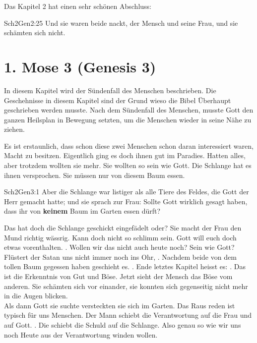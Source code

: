 Das Kapitel 2 hat einen sehr schönen Abschluss:
\begin{bibeltext}{Sch2}{Gen}{2:25}
	Und sie waren beide nackt, der Mensch und seine Frau, und sie schämten sich nicht.
\end{bibeltext}
\section{1. Mose 3 (Genesis 3)}
In diesem Kapitel wird der Sündenfall des Menschen beschrieben. Die Geschehnisse in diesem Kapitel sind der Grund wieso die Bibel Überhaupt geschrieben werden musste. Nach dem Sündenfall des Menschen, musste Gott den ganzen Heilsplan in Bewegung setzten, um die Menschen wieder in seine Nähe zu ziehen.

Es ist erstaunlich, dass schon diese zwei Menschen schon daran interessiert waren, Macht zu besitzen. Eigentlich ging es doch ihnen gut im Paradies. Hatten alles, aber trotzdem wollten sie mehr. Sie wollten so sein wie Gott. Die Schlange hat es ihnen versprochen. Sie müssen nur von diesem Baum essen.
\begin{bibeltext}{Sch2}{Gen}{3:1}
	Aber die Schlange war listiger als alle Tiere des Feldes, die Gott der Herr gemacht hatte; und sie sprach zur Frau: Sollte Gott wirklich gesagt haben, dass ihr von \textbf{keinem} Baum im Garten essen dürft?
\end{bibeltext}
Das hat doch die Schlange geschickt eingefädelt oder? Sie macht der Frau den Mund richtig wässrig. Kann doch nicht so schlimm sein. Gott will euch doch etwas vorenthalten. . Wollen wir das nicht auch heute noch? Sein wie Gott? Flüstert der Satan uns nicht immer noch ins Ohr, .
Nachdem beide von dem tollen Baum gegessen haben geschieht es. . Ende letztes Kapitel heisst es: . Das ist die Erkenntnis von Gut und Böse. Jetzt sieht der Mensch das Böse vom anderen. Sie schämten sich vor einander, sie konnten sich gegenseitig nicht mehr in die Augen blicken.\\
Als dann Gott sie suchte versteckten sie sich im Garten. Das Raus reden ist typisch für uns Menschen. Der Mann schiebt die Verantwortung auf die Frau und auf Gott. . Die schiebt die Schuld auf die Schlange. Also genau so wie wir uns noch Heute aus der Verantwortung winden wollen.

